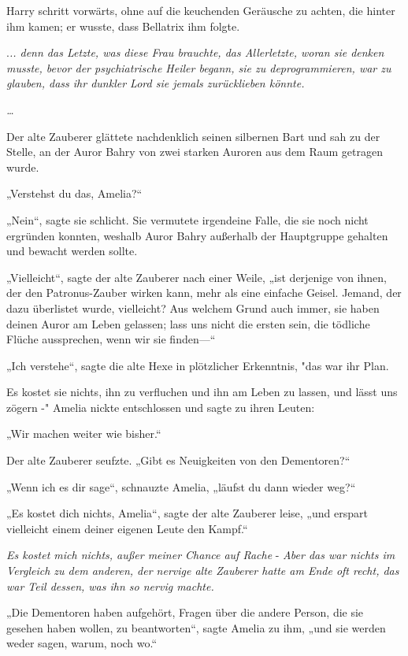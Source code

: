 {Harry schritt vorwärts, ohne auf die keuchenden Geräusche zu achten, die hinter ihm kamen; er wusste, dass Bellatrix ihm folgte.

.\emph{.. denn das Letzte, was diese Frau brauchte, das Allerletzte, woran sie denken musste, bevor der psychiatrische Heiler begann, sie zu deprogrammieren, war zu glauben, dass ihr dunkler Lord sie jemals zurücklieben könnte.}

\emph{…}

Der alte Zauberer glättete nachdenklich seinen silbernen Bart und sah zu der Stelle, an der Auror Bahry von zwei starken Auroren aus dem Raum getragen wurde.

„Verstehst du das, Amelia?“

„Nein“, sagte sie schlicht. Sie vermutete irgendeine Falle, die sie noch nicht ergründen konnten, weshalb Auror Bahry außerhalb der Hauptgruppe gehalten und bewacht werden sollte.

„Vielleicht“, sagte der alte Zauberer nach einer Weile, „ist derjenige von ihnen, der den Patronus-Zauber wirken kann, mehr als eine einfache Geisel. Jemand, der dazu überlistet wurde, vielleicht? Aus welchem Grund auch immer, sie haben deinen Auror am Leben gelassen; lass uns nicht die ersten sein, die tödliche Flüche aussprechen, wenn wir sie finden—“

„Ich verstehe“, sagte die alte Hexe in plötzlicher Erkenntnis, "das war ihr Plan.

Es kostet sie nichts, ihn zu verfluchen und ihn am Leben zu lassen, und lässt uns zögern -" Amelia nickte entschlossen und sagte zu ihren Leuten:

„Wir machen weiter wie bisher.“

Der alte Zauberer seufzte. „Gibt es Neuigkeiten von den Dementoren?“

„Wenn ich es dir sage“, schnauzte Amelia, „läufst du dann wieder weg?“

„Es kostet dich nichts, Amelia“, sagte der alte Zauberer leise, „und erspart vielleicht einem deiner eigenen Leute den Kampf.“

\emph{Es kostet mich nichts, außer meiner Chance auf Rache} - \emph{Aber das war nichts im Vergleich zu dem anderen, der nervige alte Zauberer hatte am Ende oft recht, das war Teil dessen, was ihn so nervig machte.}

„Die Dementoren haben aufgehört, Fragen über die andere Person, die sie gesehen haben wollen, zu beantworten“, sagte Amelia zu ihm, „und sie werden weder sagen, warum, noch wo.“

}
